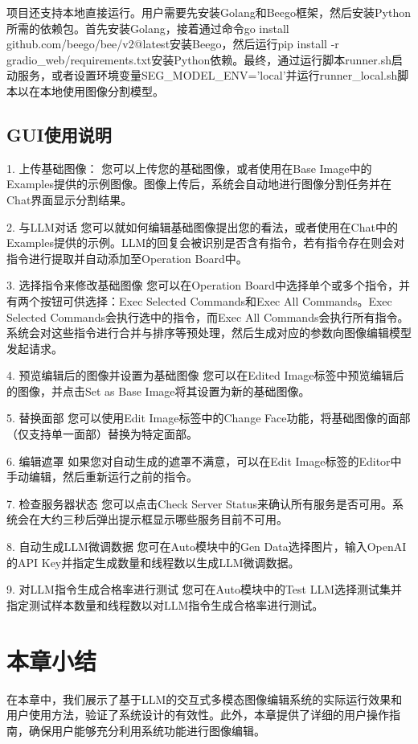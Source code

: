 \documentclass[a4paper,AutoFakeBold,oneside,12pt]{book}
\begin{document}
项目还支持本地直接运行。用户需要先安装Golang和Beego框架，然后安装Python所需的依赖包。首先安装Golang，接着通过命令go install github.com/beego/bee/v2@latest安装Beego，然后运行pip install -r gradio\_web/requirements.txt安装Python依赖。最终，通过运行脚本runner.sh启动服务，或者设置环境变量SEG\_MODEL\_ENV='local'并运行runner\_local.sh脚本以在本地使用图像分割模型。

\subsection{GUI使用说明}
1. 上传基础图像：
您可以上传您的基础图像，或者使用在Base Image中的Examples提供的示例图像。图像上传后，系统会自动地进行图像分割任务并在Chat界面显示分割结果。

2. 与LLM对话
您可以就如何编辑基础图像提出您的看法，或者使用在Chat中的Examples提供的示例。LLM的回复会被识别是否含有指令，若有指令存在则会对指令进行提取并自动添加至Operation Board中。

3. 选择指令来修改基础图像
您可以在Operation Board中选择单个或多个指令，并有两个按钮可供选择：Exec Selected Commands和Exec All Commands。Exec Selected Commands会执行选中的指令，而Exec All Commands会执行所有指令。系统会对这些指令进行合并与排序等预处理，然后生成对应的参数向图像编辑模型发起请求。

4. 预览编辑后的图像并设置为基础图像
您可以在Edited Image标签中预览编辑后的图像，并点击Set as Base Image将其设置为新的基础图像。

5. 替换面部
您可以使用Edit Image标签中的Change Face功能，将基础图像的面部（仅支持单一面部）替换为特定面部。

6. 编辑遮罩
如果您对自动生成的遮罩不满意，可以在Edit Image标签的Editor中手动编辑，然后重新运行之前的指令。

7. 检查服务器状态
您可以点击Check Server Status来确认所有服务是否可用。系统会在大约三秒后弹出提示框显示哪些服务目前不可用。

8. 自动生成LLM微调数据
您可在Auto模块中的Gen Data选择图片，输入OpenAI的API Key并指定生成数量和线程数以生成LLM微调数据。

9. 对LLM指令生成合格率进行测试
您可在Auto模块中的Test LLM选择测试集并指定测试样本数量和线程数以对LLM指令生成合格率进行测试。

\section{本章小结}
在本章中，我们展示了基于LLM的交互式多模态图像编辑系统的实际运行效果和用户使用方法，验证了系统设计的有效性。此外，本章提供了详细的用户操作指南，确保用户能够充分利用系统功能进行图像编辑。
\end{document}
